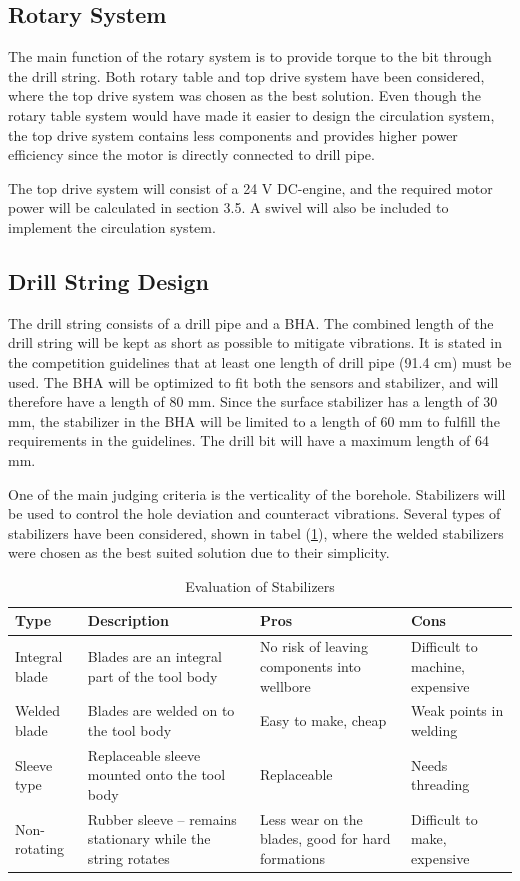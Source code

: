\subsection{Rotary System}
The main function of the rotary system is to provide torque to the bit through the drill string. Both rotary table and top drive system have been considered, where the top drive system was chosen as the best solution. Even though the rotary table system would have made it easier to design the circulation system, the top drive system contains less components and provides higher power efficiency since the motor is directly connected to drill pipe. 

The top drive system will consist of a 24 V DC-engine, and the required motor power will be calculated in section 3.5. A swivel will also be included to implement the circulation system. 



\subsection{Drill String Design}
The drill string consists of a drill pipe and a BHA. The combined length of the drill string will be kept as short as possible to mitigate vibrations. It is stated in the competition guidelines that at least one length of drill pipe (91.4 cm) must be used. The BHA will be optimized to fit both the sensors and stabilizer, and will therefore have a length of 80 mm. Since the surface stabilizer has a length of 30 mm, the stabilizer in the BHA will be limited to a length of 60 mm to fulfill the requirements in the guidelines. The drill bit will have a maximum length of 64 mm.    

One of the main judging criteria is the verticality of the borehole. Stabilizers will be used to control the hole deviation and counteract vibrations. Several types of stabilizers have been considered, shown in tabel (\ref{tab:evastab}), where the welded stabilizers were chosen as the best suited solution due to their simplicity. 


\begin{table} [H]
    \centering
    \caption{Evaluation of Stabilizers}
    \begin{tabular}{p{2cm}|p{3cm}|p{3cm}|p{3cm}}
        Type & Description & Pros & Cons \\ \hline \hline
        Integral blade & Blades are an integral part of the tool body & No risk of leaving components into wellbore & Difficult to machine, expensive \\ \hline
        Welded blade & Blades are welded on to the tool body & Easy to make, cheap & Weak points in welding  \\ \hline
        Sleeve type & Replaceable sleeve mounted onto the tool body & Replaceable & Needs threading  \\ \hline
        Non-rotating & Rubber sleeve – remains stationary while the string rotates & Less wear on the blades, good for hard formations & Difficult to make, expensive  \\
    \end{tabular}
    \label{tab:evastab}
\end{table}


